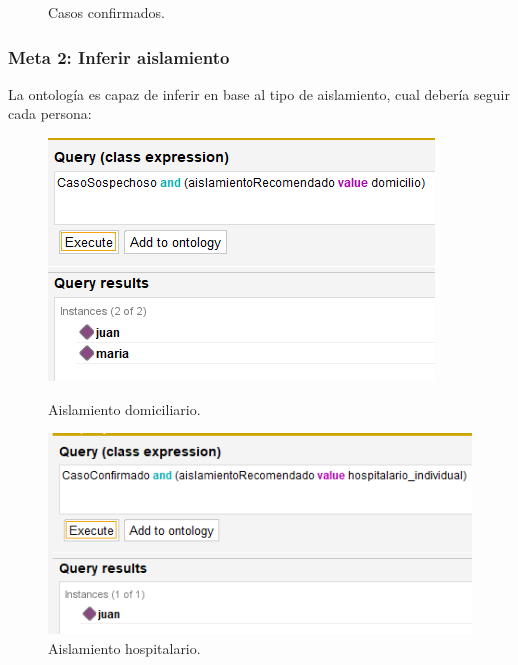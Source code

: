 \documentclass[11pt, letterpaper]{article}
\begin{document}
\begin{figure}[h!]
\begin{minipage}[t]{0.5\linewidth}
		\caption{Casos confirmados.}
		\label{fig:r4}
	\end{minipage}
\end{figure}
	
\newpage

\subsubsection{Meta 2: Inferir aislamiento}

La ontología es capaz de inferir en base al tipo de aislamiento, cual debería seguir cada persona:

\begin{figure}[h!]
	\centering
	\begin{minipage}[t]{0.5\linewidth} %
		\centering
		\includegraphics[width=\linewidth]{IMG/R5}
		\caption{Aislamiento domiciliario.}
		\label{fig:r5}
	\end{minipage}%
	\hfill %
	\begin{minipage}[t]{0.5\linewidth} %
		\centering
		\includegraphics[width=\linewidth]{IMG/R6}
		\caption{Aislamiento hospitalario.}
		\label{fig:r6}
	\end{minipage}
\end{figure}
\end{document}
